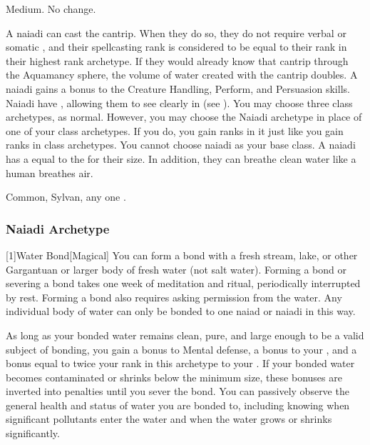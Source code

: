          Medium.
         No change.
        \begin{itemize}
             A naiadi can cast the  cantrip.
                When they do so, they do not require verbal or somatic , and their spellcasting rank is considered to be equal to their rank in their highest rank archetype.
                If they would already know that cantrip through the Aquamancy sphere, the volume of water created with the cantrip doubles.
             A naiadi gains a  bonus to the Creature Handling, Perform, and Persuasion skills.
             Naiadi have , allowing them to see clearly in  (see ).
             You may choose three class archetypes, as normal.
                However, you may choose the Naiadi archetype in place of one of your class archetypes.
                If you do, you gain ranks in it just like you gain ranks in class archetypes.
                You cannot choose naiadi as your base class.
             A naiadi has a  equal to the  for their size.
                In addition, they can breathe clean water like a human breathes air.
        \end{itemize}
         Common, Sylvan, any one .

        \subsubsection{Naiadi Archetype}

            [1]{Water Bond}[Magical] You can form a bond with a fresh stream, lake, or other Gargantuan or larger body of fresh water (not salt water).
            Forming a bond or severing a bond takes one week of meditation and ritual, periodically interrupted by rest.
            Forming a bond also requires asking permission from the water.
            Any individual body of water can only be bonded to one naiad or naiadi in this way.

            As long as your bonded water remains clean, pure, and large enough to be a valid subject of bonding, you gain a  bonus to Mental defense, a  bonus to your , and a bonus equal to twice your rank in this archetype to your .
            If your bonded water becomes contaminated or shrinks below the minimum size, these bonuses are inverted into penalties until you sever the bond.
            You can passively observe the general health and status of water you are bonded to, including knowing when significant pollutants enter the water and when the water grows or shrinks significantly.

